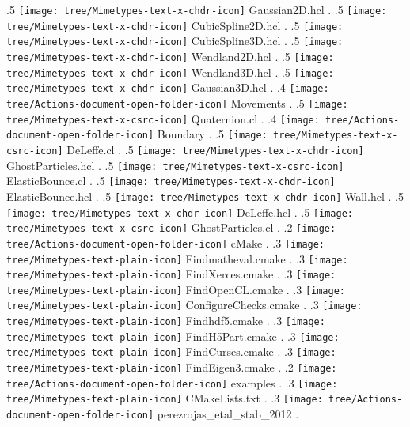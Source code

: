 {.5 { \texttt{[image: tree/Mimetypes-text-x-chdr-icon]} Gaussian2D.hcl }.
.5 { \texttt{[image: tree/Mimetypes-text-x-chdr-icon]} CubicSpline2D.hcl }.
.5 { \texttt{[image: tree/Mimetypes-text-x-chdr-icon]} CubicSpline3D.hcl }.
.5 { \texttt{[image: tree/Mimetypes-text-x-chdr-icon]} Wendland2D.hcl }.
.5 { \texttt{[image: tree/Mimetypes-text-x-chdr-icon]} Wendland3D.hcl }.
.5 { \texttt{[image: tree/Mimetypes-text-x-chdr-icon]} Gaussian3D.hcl }.
.4 { \texttt{[image: tree/Actions-document-open-folder-icon]} Movements }.
.5 { \texttt{[image: tree/Mimetypes-text-x-csrc-icon]} Quaternion.cl }.
.4 { \texttt{[image: tree/Actions-document-open-folder-icon]} Boundary }.
.5 { \texttt{[image: tree/Mimetypes-text-x-csrc-icon]} DeLeffe.cl }.
.5 { \texttt{[image: tree/Mimetypes-text-x-chdr-icon]} GhostParticles.hcl }.
.5 { \texttt{[image: tree/Mimetypes-text-x-csrc-icon]} ElasticBounce.cl }.
.5 { \texttt{[image: tree/Mimetypes-text-x-chdr-icon]} ElasticBounce.hcl }.
.5 { \texttt{[image: tree/Mimetypes-text-x-chdr-icon]} Wall.hcl }.
.5 { \texttt{[image: tree/Mimetypes-text-x-chdr-icon]} DeLeffe.hcl }.
.5 { \texttt{[image: tree/Mimetypes-text-x-csrc-icon]} GhostParticles.cl }.
.2 { \texttt{[image: tree/Actions-document-open-folder-icon]} cMake }.
.3 { \texttt{[image: tree/Mimetypes-text-plain-icon]} Findmatheval.cmake }.
.3 { \texttt{[image: tree/Mimetypes-text-plain-icon]} FindXerces.cmake }.
.3 { \texttt{[image: tree/Mimetypes-text-plain-icon]} FindOpenCL.cmake }.
.3 { \texttt{[image: tree/Mimetypes-text-plain-icon]} ConfigureChecks.cmake }.
.3 { \texttt{[image: tree/Mimetypes-text-plain-icon]} Findhdf5.cmake }.
.3 { \texttt{[image: tree/Mimetypes-text-plain-icon]} FindH5Part.cmake }.
.3 { \texttt{[image: tree/Mimetypes-text-plain-icon]} FindCurses.cmake }.
.3 { \texttt{[image: tree/Mimetypes-text-plain-icon]} FindEigen3.cmake }.
.2 { \texttt{[image: tree/Actions-document-open-folder-icon]} examples }.
.3 { \texttt{[image: tree/Mimetypes-text-plain-icon]} CMakeLists.txt }.
.3 { \texttt{[image: tree/Actions-document-open-folder-icon]} perezrojas\_etal\_stab\_2012 }.
}
